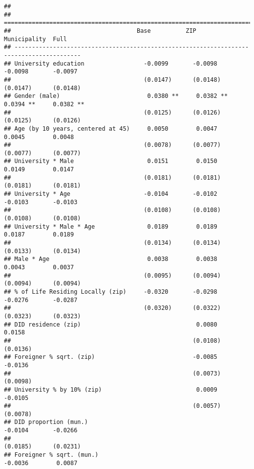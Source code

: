\documentclass[
]{article}
\begin{document}
\begin{verbatim}
## 
## =========================================================================================
##                                    Base          ZIP           Municipality  Full        
## -----------------------------------------------------------------------------------------
## University education                 -0.0099       -0.0098       -0.0098       -0.0097   
##                                      (0.0147)      (0.0148)      (0.0147)      (0.0148)  
## Gender (male)                         0.0380 **     0.0382 **     0.0394 **     0.0382 **
##                                      (0.0125)      (0.0126)      (0.0125)      (0.0126)  
## Age (by 10 years, centered at 45)     0.0050        0.0047        0.0045        0.0048   
##                                      (0.0078)      (0.0077)      (0.0077)      (0.0077)  
## University * Male                     0.0151        0.0150        0.0149        0.0147   
##                                      (0.0181)      (0.0181)      (0.0181)      (0.0181)  
## University * Age                     -0.0104       -0.0102       -0.0103       -0.0103   
##                                      (0.0108)      (0.0108)      (0.0108)      (0.0108)  
## University * Male * Age               0.0189        0.0189        0.0187        0.0189   
##                                      (0.0134)      (0.0134)      (0.0133)      (0.0134)  
## Male * Age                            0.0038        0.0038        0.0043        0.0037   
##                                      (0.0095)      (0.0094)      (0.0094)      (0.0094)  
## % of Life Residing Locally (zip)     -0.0320       -0.0298       -0.0276       -0.0287   
##                                      (0.0320)      (0.0322)      (0.0323)      (0.0323)  
## DID residence (zip)                                 0.0080                      0.0158   
##                                                    (0.0108)                    (0.0136)  
## Foreigner % sqrt. (zip)                            -0.0085                     -0.0136   
##                                                    (0.0073)                    (0.0098)  
## University % by 10% (zip)                           0.0009                     -0.0105   
##                                                    (0.0057)                    (0.0078)  
## DID proportion (mun.)                                            -0.0104       -0.0266   
##                                                                  (0.0185)      (0.0231)  
## Foreigner % sqrt. (mun.)                                         -0.0036        0.0087   

\end{verbatim}
\end{document}
